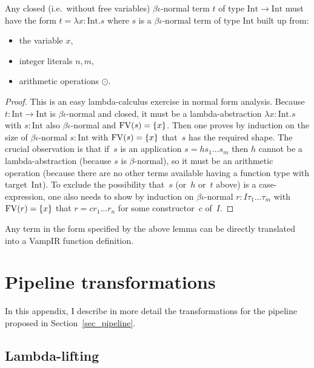 \begin{lemma}
  Any closed (i.e.~without free variables) $\beta\iota$-normal term
  $t$ of type $\mathrm{Int} \to \mathrm{Int}$ must have the form $t =
  \lambda x : \mathrm{Int} . s$ where $s$ is a $\beta\iota$-normal
  term of type $\mathrm{Int}$ built up from:
  \begin{itemize}
  \item the variable $x$,
  \item integer literals $n, m$,
  \item arithmetic operations $\odot$.
  \end{itemize}
\end{lemma}

\begin{proof}
  This is an easy lambda-calculus exercise in normal form
  analysis. Because $t : \mathrm{Int} \to \mathrm{Int}$ is
  $\beta\iota$-normal and closed, it must be a lambda-abstraction
  $\lambda x : \mathrm{Int} . s$ with $s : \mathrm{Int}$ also
  $\beta\iota$-normal and $\mathrm{FV}(s) = \{x\}$. Then one proves by
  induction on the size of $\beta\iota$-normal $s : \mathrm{Int}$ with
  $\mathrm{FV}(s) = \{x\}$ that~$s$ has the required shape. The crucial
  observation is that if~$s$ is an application $s = h s_1 \ldots s_m$
  then $h$ cannot be a lambda-abstraction (because $s$ is
  $\beta$-normal), so it must be an arithmetic operation (because
  there are no other terms available having a function type with
  target~$\mathrm{Int}$). To exclude the possibility that~$s$ (or~$h$
  or~$t$ above) is a case-expression, one also needs to show by
  induction on $\beta\iota$-normal $r : I \tau_1 \ldots \tau_m$ with
  $\mathrm{FV}(r) = \{x\}$ that $r = c r_1 \ldots r_n$ for some constructor~$c$
  of~$I$.
\end{proof}

Any term in the form specified by the above lemma can be directly
translated into a VampIR function definition.

\clearpage
\section{Pipeline transformations}\label{sec_transformations}

In this appendix, I describe in more detail the transformations for
the pipeline proposed in Section~\ref{sec_pipeline}.

\subsection{Lambda-lifting}

